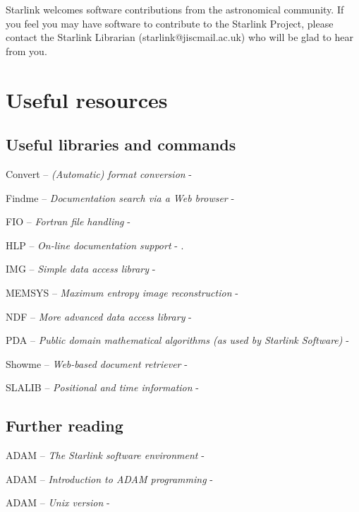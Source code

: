 \documentclass[11pt,nolof]{starlink}
\begin{document}
Starlink welcomes software contributions from the astronomical community.
If you feel you may have software to contribute to the Starlink Project,
please contact the Starlink Librarian (\textsf{starlink@jiscmail.ac.uk}) who
will be glad to hear from you.

\newpage

\appendix

\section{Useful resources}

\subsection{Useful libraries and commands}

Convert -- \emph{(Automatic) format conversion} - 

Findme -- \emph{Documentation search via a Web browser} -

FIO -- \emph{Fortran file handling} - 

HLP -- \emph{On-line documentation support} - .

IMG -- \emph{Simple data access library} - 

MEMSYS -- \emph{Maximum entropy image reconstruction} -

NDF -- \emph{More advanced data access library} - 

PDA -- \emph{Public domain mathematical algorithms (as used by Starlink
Software)} - 

Showme -- \emph{Web-based document retriever} - 

SLALIB -- \emph{Positional and time information} - 

\subsection{Further reading}

ADAM -- \emph{The Starlink software environment} - 

ADAM -- \emph{Introduction to ADAM programming} - 

ADAM -- \emph{Unix version} - 
\end{document}

